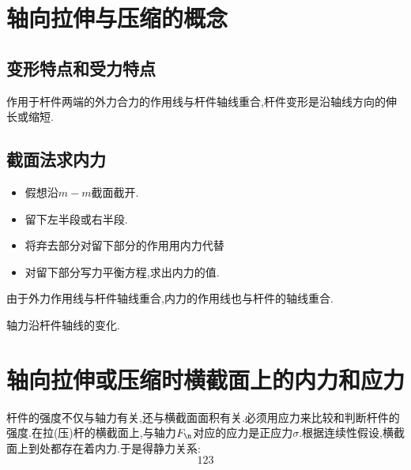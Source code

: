 \section{轴向拉伸与压缩的概念}
\subsection{变形特点和受力特点}
作用于杆件两端的外力合力的作用线与杆件轴线重合,杆件变形是沿轴线方向的伸长或缩短.

\subsection{截面法求内力}
\begin{method}
	\begin{itemize}
		\item 假想沿$m-m$截面截开.
		\item 留下左半段或右半段.
		\item 将弃去部分对留下部分的作用用内力代替
		\item 对留下部分写力平衡方程,求出内力的值.
	\end{itemize}
\end{method}

\begin{definition}[轴\index{ZL@轴力}力]
	由于外力作用线与杆件轴线重合,内力的作用线也与杆件的轴线重合.\\
\end{definition}

\begin{definition}
	轴力沿杆件轴线的变化.
\end{definition}
\section{轴向拉伸或压缩时横截面上的内力和应力} 
杆件的强度不仅与轴力有关,还与横截面面积有关.必须用应力来比较和判断杆件的强度.在拉(压)杆的横截面上,与轴力$F_ {\n}$对应的应力是正应力$\sigma$.根据连续性假设,横截面上到处都存在着内力.于是得静力关系:
\begin{equation}
	123
\end{equation}


















